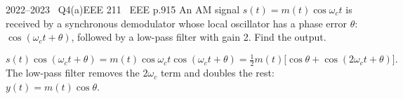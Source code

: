 \begin{qcard}{2022--2023 \textbullet\ Q4(a)}{EEE 211 \textbullet\ EEE p.9}{15}
An AM signal $s(t)=m(t)\cos\omega_ct$ is received by a synchronous demodulator whose local oscillator has a phase error $\theta$: $\cos(\omega_ct+\theta)$, followed by a low-pass filter with gain 2. Find the output.
\end{qcard}
\begin{solution}
\[s(t)\cos(\omega_ct+\theta)=m(t)\cos\omega_ct\cos(\omega_ct+\theta)=\tfrac12m(t)\big[\cos\theta+\cos(2\omega_ct+\theta)\big].\]
The low-pass filter removes the $2\omega_c$ term and doubles the rest: $y(t)=m(t)\cos\theta$.
\end{solution}

